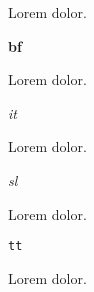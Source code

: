 





Lorem  dolor.

{\bf bf}

Lorem  dolor.

{\it it}

Lorem  dolor.

{\sl sl}

Lorem  dolor.

{\tt tt}

Lorem  dolor.

\bye
